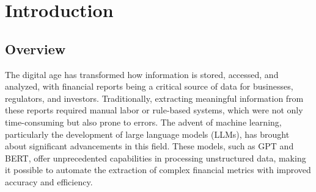 \documentclass[english, 12pt, a4paper, elec, utf8, a-2b, online]{aaltothesis}
\begin{document}
\begin{acronym}
\end{acronym}



\thispagestyle{empty}

\newpage
\section{Introduction}
\label{sec:intro}

\subsection{Overview}

The digital age has transformed how information is stored, accessed, and analyzed, with financial reports being a critical source of data for businesses, regulators, and investors. Traditionally, extracting meaningful information from these reports required manual labor or rule-based systems, which were not only time-consuming but also prone to errors. The advent of machine learning, particularly the development of large language models (\acp{LLM}), has brought about significant advancements in this field. These models, such as \ac{GPT} and \ac{BERT}, offer unprecedented capabilities in processing unstructured data, making it possible to automate the extraction of complex financial metrics with improved accuracy and efficiency.
\end{document}
